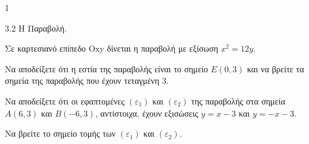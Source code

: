 \begin{ylh}{1}
    \item 3.2 Η Παραβολή.
\end{ylh}
Σε καρτεσιανό επίπεδο Oxy δίνεται η παραβολή με εξίσωση $x^2 = 12y$.
\begin{alist}
\item Να αποδείξετε ότι η εστία της παραβολής είναι το σημείο $E(0,3)$ και να βρείτε τα σημεία της παραβολής που έχουν τεταγμένη 3. 
\item Να αποδείξετε ότι οι εφαπτομένες $(\varepsilon_1)$ και $(\varepsilon_2)$ της παραβολής στα σημεία $A(6,3)$ και $B(-6,3)$, αντίστοιχα, έχουν εξισώσεις $y = x - 3$ και $y = -x - 3$. 
\item Να βρείτε το σημείο τομής των $(\varepsilon_1)$ και $(\varepsilon_2)$. 
\end{alist}